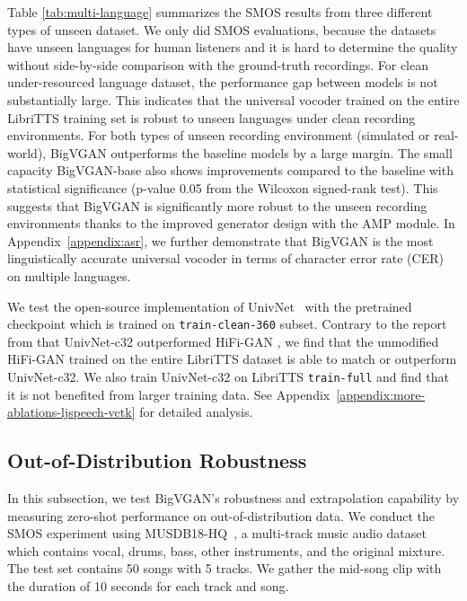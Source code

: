 \documentclass{article} \usepackage{iclr2023_conference,times}
\theoremstyle{plain}
\theoremstyle{definition}
\theoremstyle{remark}
\begin{document}
Table \ref{tab:multi-language} summarizes the SMOS results from three different types of unseen dataset. We only did SMOS evaluations, because the datasets have unseen languages for human listeners and it is hard to determine the quality without side-by-side comparison with the ground-truth recordings. 
For clean under-resourced language dataset, the performance gap between models is not substantially large. This indicates that the universal vocoder trained on the entire LibriTTS training set is robust to unseen languages under clean recording environments.
For both types of unseen recording environment (simulated or real-world), BigVGAN outperforms the baseline models by a large margin. The small capacity BigVGAN-base also shows improvements compared to the baseline with statistical significance (p-value  0.05 from the Wilcoxon signed-rank test). This suggests that BigVGAN is significantly more robust to the unseen recording environments thanks to the improved generator design with the AMP module.
In Appendix~\ref{appendix:asr}, we further demonstrate that BigVGAN is the most linguistically accurate universal vocoder in terms of character error rate (CER) on multiple languages.


We test the open-source implementation of UnivNet~\citep{jang2021univnet} with the pretrained checkpoint which is trained on \texttt{train-clean-360} subset. 
Contrary to the report from \citet{jang2021univnet} that UnivNet-c32 outperformed HiFi-GAN \citep{kong2020hifi}, we find that the unmodified HiFi-GAN trained on the entire LibriTTS dataset is able to match or outperform UnivNet-c32. 
We also train UnivNet-c32 on LibriTTS \texttt{train-full} and find that it is not benefited from larger training data. See Appendix~\ref{appendix:more-ablations-ljspeech-vctk} for detailed analysis. 


\vspace{-.2cm}
\subsection{Out-of-Distribution Robustness}
\vspace{-.1cm}
In this subsection, we test BigVGAN's robustness and extrapolation capability by measuring zero-shot performance on out-of-distribution data. We conduct the SMOS experiment using MUSDB18-HQ~\citep{musdb18-hq}, a multi-track music audio dataset which contains vocal, drums, bass, other instruments, and the original mixture. The test set contains 50 songs with 5 tracks. We gather the mid-song clip with the duration of 10 seconds for each track and song.
\end{document}
